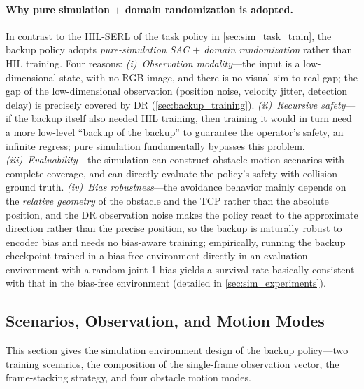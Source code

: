\paragraph{Why pure simulation $+$ domain randomization is adopted.} In contrast to the HIL-SERL of the task policy in \cref{sec:sim_task_train}, the backup policy adopts \emph{pure-simulation SAC $+$ domain randomization} rather than HIL training. Four reasons: \emph{(i)~Observation modality}---the input is a low-dimensional state, with no RGB image, and there is no visual sim-to-real gap; the gap of the low-dimensional observation (position noise, velocity jitter, detection delay) is precisely covered by DR (\cref{sec:backup_training}). \emph{(ii)~Recursive safety}---if the backup itself also needed HIL training, then training it would in turn need a more low-level ``backup of the backup'' to guarantee the operator's safety, an infinite regress; pure simulation fundamentally bypasses this problem. \emph{(iii)~Evaluability}---the simulation can construct obstacle-motion scenarios with complete coverage, and can directly evaluate the policy's safety with collision ground truth. \emph{(iv)~Bias robustness}---the avoidance behavior mainly depends on the \emph{relative geometry} of the obstacle and the TCP rather than the absolute position, and the DR observation noise makes the policy react to the approximate direction rather than the precise position, so the backup is naturally robust to encoder bias and needs no bias-aware training; empirically, running the backup checkpoint trained in a bias-free environment directly in an evaluation environment with a random joint-1 bias yields a survival rate basically consistent with that in the bias-free environment (detailed in \cref{sec:sim_experiments}).

\subsection{Scenarios, Observation, and Motion Modes}\label{sec:scenarios}

This section gives the simulation environment design of the backup policy---two training scenarios, the composition of the single-frame observation vector, the frame-stacking strategy, and four obstacle motion modes.

